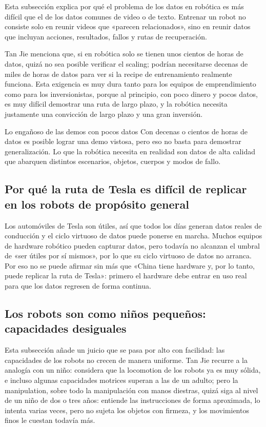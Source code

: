 \documentclass[a4paper]{article}
\begin{document}
Esta subsección explica por qué el problema de los datos en robótica es más difícil que el de los datos comunes de video o de texto. Entrenar un robot no consiste solo en reunir videos que «parecen relacionados», sino en reunir datos que incluyan acciones, resultados, fallos y rutas de recuperación.

Tan Jie menciona que, si en robótica solo se tienen unos cientos de horas de datos, quizá no sea posible verificar el scaling; podrían necesitarse decenas de miles de horas de datos para ver si la recipe de entrenamiento realmente funciona. Esta exigencia es muy dura tanto para los equipos de emprendimiento como para los inversionistas, porque al principio, con poco dinero y pocos datos, es muy difícil demostrar una ruta de largo plazo, y la robótica necesita justamente una convicción de largo plazo y una gran inversión.

\begin{warningbox}{Lo engañoso de las demos con pocos datos}
Con decenas o cientos de horas de datos es posible lograr una demo vistosa, pero eso no basta para demostrar generalización. Lo que la robótica necesita en realidad son datos de alta calidad que abarquen distintos escenarios, objetos, cuerpos y modos de fallo.
\end{warningbox}

\subsection{Por qué la ruta de Tesla es difícil de replicar en los robots de propósito general}

Los automóviles de Tesla son útiles, así que todos los días generan datos reales de conducción y el ciclo virtuoso de datos puede ponerse en marcha. Muchos equipos de hardware robótico pueden capturar datos, pero todavía no alcanzan el umbral de «ser útiles por sí mismos», por lo que su ciclo virtuoso de datos no arranca. Por eso no se puede afirmar sin más que «China tiene hardware y, por lo tanto, puede replicar la ruta de Tesla»: primero el hardware debe entrar en uso real para que los datos regresen de forma continua.

\subsection{Los robots son como niños pequeños: capacidades desiguales}

Esta subsección añade un juicio que se pasa por alto con facilidad: las capacidades de los robots no crecen de manera uniforme. Tan Jie recurre a la analogía con un niño: considera que la locomotion de los robots ya es muy sólida, e incluso algunas capacidades motrices superan a las de un adulto; pero la manipulation, sobre todo la manipulación con manos diestras, quizá siga al nivel de un niño de dos o tres años: entiende las instrucciones de forma aproximada, lo intenta varias veces, pero no sujeta los objetos con firmeza, y los movimientos finos le cuestan todavía más.
\end{document}
